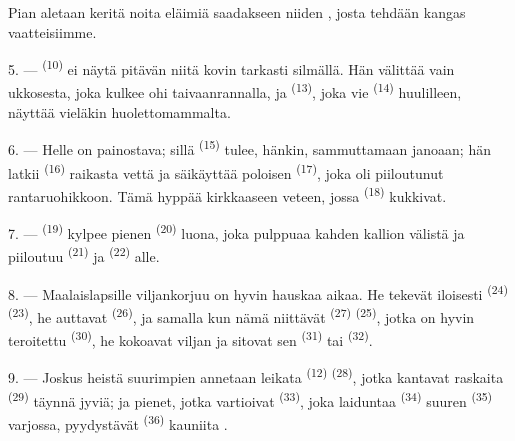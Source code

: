 Pian aletaan keritä noita eläimiä saadakseen niiden , josta
tehdään kangas vaatteisiimme.

\VUsaut{5.0mm}
\VUsaut{3.4mm}

5. ---  \textsuperscript{(10)} ei näytä pitävän niitä kovin
tarkasti silmällä. Hän välittää vain ukkosesta, joka kulkee ohi
taivaanrannalla, ja  \textsuperscript{(13)}, joka vie
 \textsuperscript{(14)} huulilleen, näyttää vieläkin
huolettomammalta.

6. --- Helle on painostava; sillä  \textsuperscript{(15)} tulee,
hänkin, sammuttamaan janoaan; hän latkii  \textsuperscript{(16)}
raikasta vettä ja säikäyttää poloisen 
\textsuperscript{(17)}, joka oli piiloutunut rantaruohikkoon. Tämä hyppää
kirkkaaseen veteen, jossa  \textsuperscript{(18)} kukkivat.

7. ---  \textsuperscript{(19)} kylpee pienen 
\textsuperscript{(20)} luona, joka pulppuaa kahden kallion välistä ja
piiloutuu  \textsuperscript{(21)} ja
 \textsuperscript{(22)} alle.

\VUsaut{5.0mm}
\VUsaut{3.4mm}

8. --- Maalaislapsille viljankorjuu on hyvin hauskaa aikaa. He tekevät iloisesti
 \textsuperscript{(24)} 
\textsuperscript{(23)}, he auttavat 
\textsuperscript{(26)}, ja samalla kun nämä niittävät 
\textsuperscript{(27)}  \textsuperscript{(25)}, jotka on
hyvin teroitettu  \textsuperscript{(30)}, he kokoavat viljan
ja sitovat sen  \textsuperscript{(31)} tai  \textsuperscript{(32)}.

9. --- Joskus heistä suurimpien annetaan leikata 
\textsuperscript{(12)}  \textsuperscript{(28)}, jotka
kantavat raskaita  \textsuperscript{(29)} täynnä jyviä; ja pienet,
jotka vartioivat  \textsuperscript{(33)}, joka laiduntaa
 \textsuperscript{(34)} suuren 
\textsuperscript{(35)} varjossa, pyydystävät 
\textsuperscript{(36)} kauniita .

